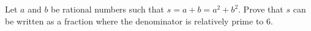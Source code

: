 Let $a$ and $b$ be rational numbers such that $s=a+b=a^2+b^2$. Prove that $s$ can be written as a fraction where the denominator is relatively prime to $6$.